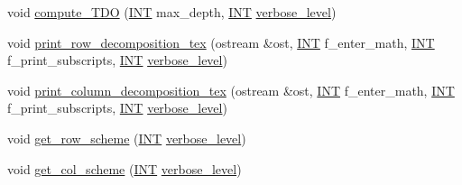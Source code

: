 \begin{DoxyCompactItemize}
\item 
void \mbox{\hyperlink{classdecomposition_acde2ae0342c89d2ba817ecdc98813cbe}{compute\+\_\+\+T\+DO}} (\mbox{\hyperlink{galois_8h_a09fddde158a3a20bd2dcadb609de11dc}{I\+NT}} max\+\_\+depth, \mbox{\hyperlink{galois_8h_a09fddde158a3a20bd2dcadb609de11dc}{I\+NT}} \mbox{\hyperlink{simeon_8_c_a818073fbcc2f439e7c56952f67386122}{verbose\+\_\+level}})
\item 
void \mbox{\hyperlink{classdecomposition_a6f9ffef0f905c9d52a941e3f8488e7de}{print\+\_\+row\+\_\+decomposition\+\_\+tex}} (ostream \&ost, \mbox{\hyperlink{galois_8h_a09fddde158a3a20bd2dcadb609de11dc}{I\+NT}} f\+\_\+enter\+\_\+math, \mbox{\hyperlink{galois_8h_a09fddde158a3a20bd2dcadb609de11dc}{I\+NT}} f\+\_\+print\+\_\+subscripts, \mbox{\hyperlink{galois_8h_a09fddde158a3a20bd2dcadb609de11dc}{I\+NT}} \mbox{\hyperlink{simeon_8_c_a818073fbcc2f439e7c56952f67386122}{verbose\+\_\+level}})
\item 
void \mbox{\hyperlink{classdecomposition_a68897261ef26c6df5d8c299356e90dbd}{print\+\_\+column\+\_\+decomposition\+\_\+tex}} (ostream \&ost, \mbox{\hyperlink{galois_8h_a09fddde158a3a20bd2dcadb609de11dc}{I\+NT}} f\+\_\+enter\+\_\+math, \mbox{\hyperlink{galois_8h_a09fddde158a3a20bd2dcadb609de11dc}{I\+NT}} f\+\_\+print\+\_\+subscripts, \mbox{\hyperlink{galois_8h_a09fddde158a3a20bd2dcadb609de11dc}{I\+NT}} \mbox{\hyperlink{simeon_8_c_a818073fbcc2f439e7c56952f67386122}{verbose\+\_\+level}})
\item 
void \mbox{\hyperlink{classdecomposition_acdb57cdc0c5b1b4692337a7a629f7113}{get\+\_\+row\+\_\+scheme}} (\mbox{\hyperlink{galois_8h_a09fddde158a3a20bd2dcadb609de11dc}{I\+NT}} \mbox{\hyperlink{simeon_8_c_a818073fbcc2f439e7c56952f67386122}{verbose\+\_\+level}})
\item 
void \mbox{\hyperlink{classdecomposition_a998bb452e79a9e4afb13dd2c577f4bf3}{get\+\_\+col\+\_\+scheme}} (\mbox{\hyperlink{galois_8h_a09fddde158a3a20bd2dcadb609de11dc}{I\+NT}} \mbox{\hyperlink{simeon_8_c_a818073fbcc2f439e7c56952f67386122}{verbose\+\_\+level}})
\end{DoxyCompactItemize}
